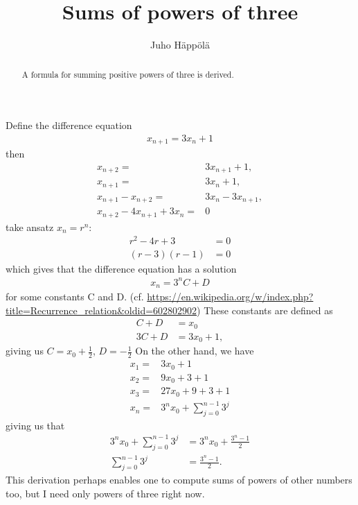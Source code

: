 \documentclass[reqno]{amsart}
\begin{document}
\title[Sums of powers of three]{Sums of powers of three}

\author[J.~H{\"a}pp{\"o}l{\"a}]{Juho H{\"a}pp{\"o}l{\"a}}



\begin{abstract}
  A formula for summing positive powers of three is derived.
   \end{abstract}


\maketitle

Define the difference equation
\begin{align*}
x_{n+1} = 3x_n+1
\end{align*}
then
\begin{align*}
x_{n+2} =& 3x_{n+1}+1, \\
x_{n+1} =& 3x_{n}+1, \\
x_{n+1} -x_{n+2} =& 3x_{n}-3x_{n+1}, \\
x_{n+2}-4 x_{n+1} +3 x_n =& 0 
\end{align*}
take ansatz $x_n=r^n$:
\begin{align*}
r^2 - 4r+3 &= 0 \\
(r-3)(r-1) &= 0
\end{align*}
which gives that the difference equation has a solution
\begin{align*}
x_n = 3^nC +D
\end{align*}
for some constants C and D.
(cf. \url{https://en.wikipedia.org/w/index.php?title=Recurrence_relation&oldid=602802902})
These constants are defined as
\begin{align*}
C + D &= x_0 \\
3C + D &= 3x_0 +1,
\end{align*}
giving us $C = x_0+\frac{1}{2}$, $D =- \frac{1}{2}$
On the other hand, we have
\begin{align*}
x_1 =& 3x_0 + 1\\
x_2 =& 9x_0 + 3 +1\\
x_3 =& 27 x_0 + 9 +3 +1 \\
x_n =& 3^n x_0 + \sum_{j=0}^{n-1} 3^{j}
\end{align*}
giving us that
\begin{align*}
3^n x_0 + \sum_{j=0}^{n-1} 3^{j} &= %
3^n x_0 +\frac{3^n-1}{2}
\\
 \sum_{j=0}^{n-1} 3^{j} &= 
 \frac{3^n-1}{2}.
\end{align*}
This derivation perhaps enables one to compute sums of powers of other numbers too, but
I need only powers of three right now.
\end{document}
